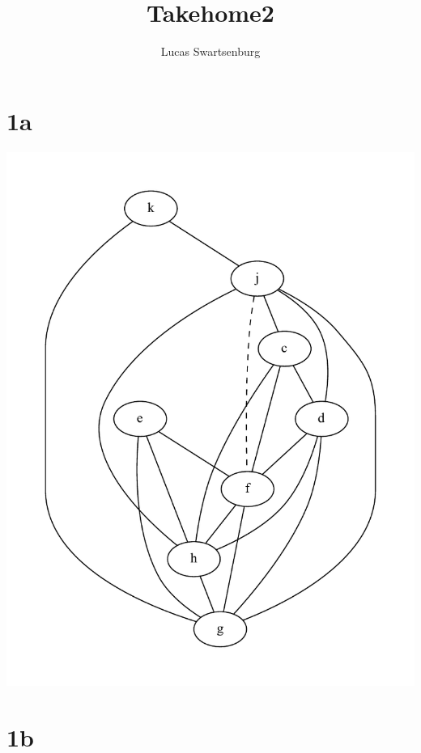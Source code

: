 \documentclass[10pt,a4paper]{article}
\author{Lucas Swartsenburg}
\title{Takehome2}
\begin{document}
\maketitle
\section*{1a}
\includegraphics[scale=0.8]{interference.pdf} 
\section*{1b}
\end{document}
